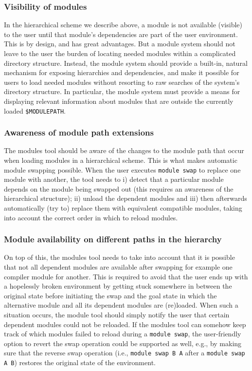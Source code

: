 \subsubsection{Visibility of modules}
\label{sec:hierarchical_consequences_visibility}

In the hierarchical scheme we describe above, a module is not available (visible)
to the user until that module's dependencies are part of the user environment.  This
is by design, and has great advantages. But a module system should not leave to the
user the burden of locating needed modules within a complicated directory structure.  Instead, the module system should provide a built-in, natural mechanism for exposing hierarchies and
dependencies, and make it possible for users to load needed modules
without resorting to raw searches of the system's directory structure. In particular, the module system must provide a means for
displaying relevant information about modules that are outside the 
currently loaded \texttt{\small \$MODULEPATH}.

\subsubsection{Awareness of module path extensions}
\label{sec:hierarchical_consequences_extensions}

The modules tool should be aware of the changes  to the module path that
occur when loading modules in a hierarchical scheme. This is what makes
automatic module swapping possible. When the user executes \texttt{\small module swap} to replace one module with another, the tool needs to i) detect that a particular
module depends on the module being swapped out (this requires an awareness of
the hierarchical structure); ii) unload the dependent
modules and iii) then afterwards
automatically (try to) replace them with equivalent compatible modules, taking into
account the correct order in which to reload modules.

\subsubsection{Module availability on different paths in the hierarchy}
\label{sec:hierarchical_consequences_availability}

On top of this, the modules tool needs to take into account that it is
possible that not all dependent modules are available after swapping for example
one compiler module for another. This is required to avoid that the user
ends up with a hopelessly broken environment by getting stuck somewhere in
between the original state before initiating the swap and the goal state
in which the alternative module and all its dependent modules are (re)loaded.
When such a situation occurs, the module tool should simply notify the user
that certain dependent modules could not be reloaded. If the modules tool
can somehow keep track of which modules failed to reload during a
\texttt{\small module swap}, the user-friendly option to revert the swap
operation could be supported as well, e.g., by making sure that the reverse
swap operation (i.e., \texttt{\small module swap B A} after a
\texttt{\small module swap A B}) restores the original state of the environment.

